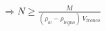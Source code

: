 \documentclass[preview]{standalone}
\begin{document}
\begin{align*}
\Rightarrow N \ge \frac{M}{(\rho_w-\rho_{legno})\,V_{tronco}}
\end{align*}
\end{document}
